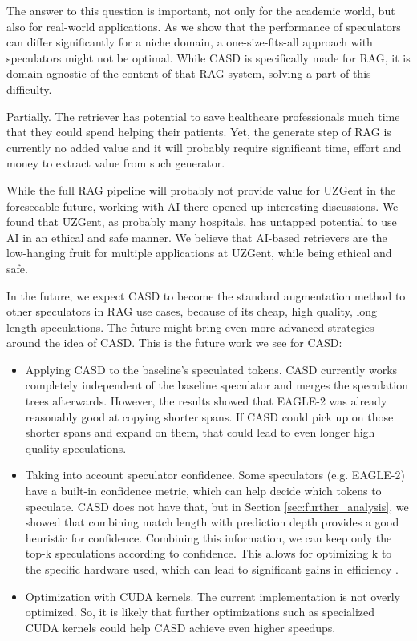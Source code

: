 The answer to this question is important, not only for the academic world, but also for real-world applications. As we show that the performance of speculators can differ significantly for a niche domain, a one-size-fits-all approach with speculators might not be optimal. While CASD is specifically made for RAG, it is domain-agnostic of the content of that RAG system, solving a part of this difficulty.

\begin{tcolorbox}[colback=blue-ish-light,colframe=blue-ish,title=\textbf{RQ3:} Can a RAG system provide additional value at UZGent?, coltitle=white]
    Partially. The retriever has potential to save healthcare professionals much time that they could spend helping their patients. Yet, the generate step of RAG is currently no added value and it will probably require significant time, effort and money to extract value from such generator.
\end{tcolorbox}

While the full RAG pipeline will probably not provide value for UZGent in the foreseeable future, working with AI there opened up interesting discussions. We found that UZGent, as probably many hospitals, has untapped potential to use AI in an ethical and safe manner. We believe that AI-based retrievers are the low-hanging fruit for multiple applications at UZGent, while being ethical and safe.

In the future, we expect CASD to become the standard augmentation method to other speculators in RAG use cases, because of its cheap, high quality, long length speculations. The future might bring even more advanced strategies around the idea of CASD. This is the future work we see for CASD:
\begin{itemize}
    \item Applying CASD to the baseline's speculated tokens. CASD currently works completely independent of the baseline speculator and merges the speculation trees afterwards. However, the results showed that EAGLE-2 was already reasonably good at copying shorter spans. If CASD could pick up on those shorter spans and expand on them, that could lead to even longer high quality speculations.
    \item Taking into account speculator confidence. Some speculators (e.g. EAGLE-2) have a built-in confidence metric, which can help decide which tokens to speculate. CASD does not have that, but in Section \ref{sec:further_analysis}, we showed that combining match length with prediction depth provides a good heuristic for confidence. Combining this information, we can keep only the top-k speculations according to confidence. This allows for optimizing k to the specific hardware used, which can lead to significant gains in efficiency \cite{fernandez2025energy}.
    \item Optimization with CUDA kernels. The current implementation is not overly optimized. So, it is likely that further optimizations such as specialized CUDA kernels could help CASD achieve even higher speedups.
\end{itemize}

